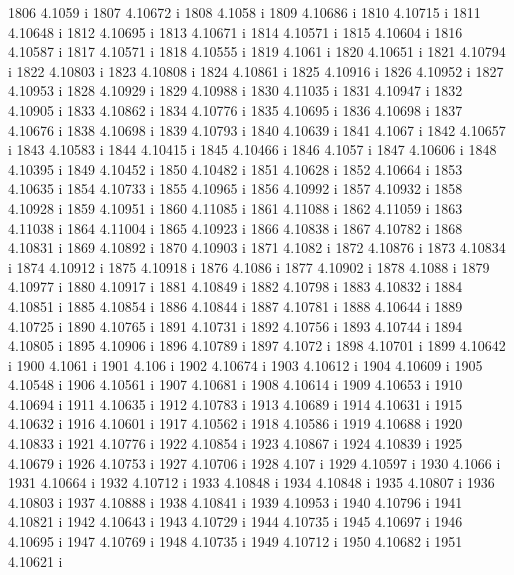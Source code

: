  1806  4.1059  i
 1807  4.10672  i
 1808  4.1058  i
 1809  4.10686  i
 1810  4.10715  i
 1811  4.10648  i
 1812  4.10695  i
 1813  4.10671  i
 1814  4.10571  i
 1815  4.10604  i
 1816  4.10587  i
 1817  4.10571  i
 1818  4.10555  i
 1819  4.1061  i
 1820  4.10651  i
 1821  4.10794  i
 1822  4.10803  i
 1823  4.10808  i
 1824  4.10861  i
 1825  4.10916  i
 1826  4.10952  i
 1827  4.10953  i
 1828  4.10929  i
 1829  4.10988  i
 1830  4.11035  i
 1831  4.10947  i
 1832  4.10905  i
 1833  4.10862  i
 1834  4.10776  i
 1835  4.10695  i
 1836  4.10698  i
 1837  4.10676  i
 1838  4.10698  i
 1839  4.10793  i
 1840  4.10639  i
 1841  4.1067  i
 1842  4.10657  i
 1843  4.10583  i
 1844  4.10415  i
 1845  4.10466  i
 1846  4.1057  i
 1847  4.10606  i
 1848  4.10395  i
 1849  4.10452  i
 1850  4.10482  i
 1851  4.10628  i
 1852  4.10664  i
 1853  4.10635  i
 1854  4.10733  i
 1855  4.10965  i
 1856  4.10992  i
 1857  4.10932  i
 1858  4.10928  i
 1859  4.10951  i
 1860  4.11085  i
 1861  4.11088  i
 1862  4.11059  i
 1863  4.11038  i
 1864  4.11004  i
 1865  4.10923  i
 1866  4.10838  i
 1867  4.10782  i
 1868  4.10831  i
 1869  4.10892  i
 1870  4.10903  i
 1871  4.1082  i
 1872  4.10876  i
 1873  4.10834  i
 1874  4.10912  i
 1875  4.10918  i
 1876  4.1086  i
 1877  4.10902  i
 1878  4.1088  i
 1879  4.10977  i
 1880  4.10917  i
 1881  4.10849  i
 1882  4.10798  i
 1883  4.10832  i
 1884  4.10851  i
 1885  4.10854  i
 1886  4.10844  i
 1887  4.10781  i
 1888  4.10644  i
 1889  4.10725  i
 1890  4.10765  i
 1891  4.10731  i
 1892  4.10756  i
 1893  4.10744  i
 1894  4.10805  i
 1895  4.10906  i
 1896  4.10789  i
 1897  4.1072  i
 1898  4.10701  i
 1899  4.10642  i
 1900  4.1061  i
 1901  4.106  i
 1902  4.10674  i
 1903  4.10612  i
 1904  4.10609  i
 1905  4.10548  i
 1906  4.10561  i
 1907  4.10681  i
 1908  4.10614  i
 1909  4.10653  i
 1910  4.10694  i
 1911  4.10635  i
 1912  4.10783  i
 1913  4.10689  i
 1914  4.10631  i
 1915  4.10632  i
 1916  4.10601  i
 1917  4.10562  i
 1918  4.10586  i
 1919  4.10688  i
 1920  4.10833  i
 1921  4.10776  i
 1922  4.10854  i
 1923  4.10867  i
 1924  4.10839  i
 1925  4.10679  i
 1926  4.10753  i
 1927  4.10706  i
 1928  4.107  i
 1929  4.10597  i
 1930  4.1066  i
 1931  4.10664  i
 1932  4.10712  i
 1933  4.10848  i
 1934  4.10848  i
 1935  4.10807  i
 1936  4.10803  i
 1937  4.10888  i
 1938  4.10841  i
 1939  4.10953  i
 1940  4.10796  i
 1941  4.10821  i
 1942  4.10643  i
 1943  4.10729  i
 1944  4.10735  i
 1945  4.10697  i
 1946  4.10695  i
 1947  4.10769  i
 1948  4.10735  i
 1949  4.10712  i
 1950  4.10682  i
 1951  4.10621  i
